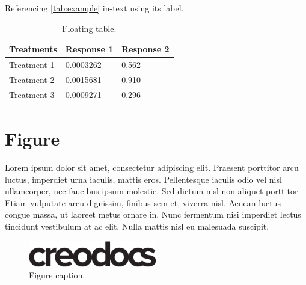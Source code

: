 \documentclass[
	11pt, %
	fleqn, %
	a4paper, %
]{LegrandOrangeBook}
\begin{document}
Referencing \autoref{tab:example} in-text using its label.

\begin{table}[t] %
	\centering %
	\begin{tabular}{L{0.15\textwidth} R{0.15\textwidth} R{0.15\textwidth}} %
		\toprule
		\textbf{Treatments} & \textbf{Response 1} & \textbf{Response 2} \\
		\midrule
		Treatment 1         & 0.0003262           & 0.562               \\
		Treatment 2         & 0.0015681           & 0.910               \\
		Treatment 3         & 0.0009271           & 0.296               \\
		\bottomrule
	\end{tabular}
	\caption{Floating table.}
	\label{tab:floating} %
\end{table}


\section{Figure}

Lorem ipsum dolor sit amet, consectetur adipiscing elit. Praesent porttitor arcu luctus, imperdiet urna iaculis, mattis eros. Pellentesque iaculis odio vel nisl ullamcorper, nec faucibus ipsum molestie. Sed dictum nisl non aliquet porttitor. Etiam vulputate arcu dignissim, finibus sem et, viverra nisl. Aenean luctus congue massa, ut laoreet metus ornare in. Nunc fermentum nisi imperdiet lectus tincidunt vestibulum at ac elit. Nulla mattis nisl eu malesuada suscipit.

\begin{figure}[H] %
	\centering %
	\includegraphics[width=0.5\textwidth]{creodocs_logo.pdf} %
	\caption{Figure caption.}
	\label{fig:placeholder} %
\end{figure}
\end{document}
